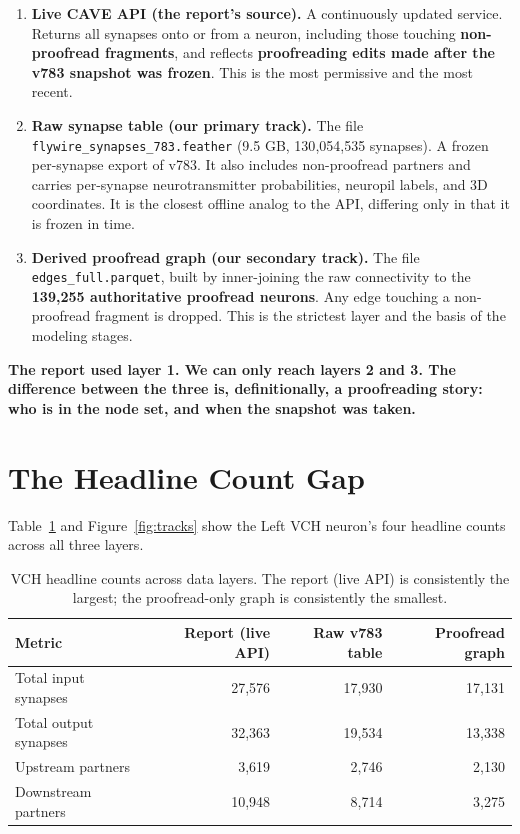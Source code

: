 \documentclass[11pt]{article}
\newcommand{\key}[1]{\textbf{#1}}
\begin{document}
\begin{enumerate}
  \item \key{Live CAVE API (the report's source).} A continuously updated service.
  Returns all synapses onto or from a neuron, including those touching
  \key{non-proofread fragments}, and reflects \key{proofreading edits made after the
  v783 snapshot was frozen}. This is the most permissive and the most recent.

  \item \key{Raw synapse table (our primary track).} The file
  \texttt{flywire\_synapses\_783.feather} (9.5 GB, 130{,}054{,}535 synapses). A frozen
  per-synapse export of v783. It also includes non-proofread partners and carries
  per-synapse neurotransmitter probabilities, neuropil labels, and 3D coordinates. It is
  the closest offline analog to the API, differing only in that it is frozen in time.

  \item \key{Derived proofread graph (our secondary track).} The file
  \texttt{edges\_full.parquet}, built by inner-joining the raw connectivity to the
  \key{139{,}255 authoritative proofread neurons}. Any edge touching a non-proofread
  fragment is dropped. This is the strictest layer and the basis of the modeling stages.
\end{enumerate}

\key{The report used layer 1. We can only reach layers 2 and 3. The difference between
the three is, definitionally, a proofreading story: who is in the node set, and when the
snapshot was taken.}

\section{The Headline Count Gap}

Table~\ref{tab:overview} and Figure~\ref{fig:tracks} show the Left VCH neuron's four
headline counts across all three layers.

\begin{table}[H]
\centering
\caption{VCH headline counts across data layers. The report (live API) is consistently
the largest; the proofread-only graph is consistently the smallest.}
\label{tab:overview}
\begin{tabular}{lrrr}
\toprule
Metric & Report (live API) & Raw v783 table & Proofread graph \\
\midrule
Total input synapses   & 27{,}576 & 17{,}930 & 17{,}131 \\
Total output synapses  & 32{,}363 & 19{,}534 & 13{,}338 \\
Upstream partners      & 3{,}619  & 2{,}746  & 2{,}130  \\
Downstream partners    & 10{,}948 & 8{,}714  & 3{,}275  \\
\bottomrule
\end{tabular}
\end{table}
\end{document}
